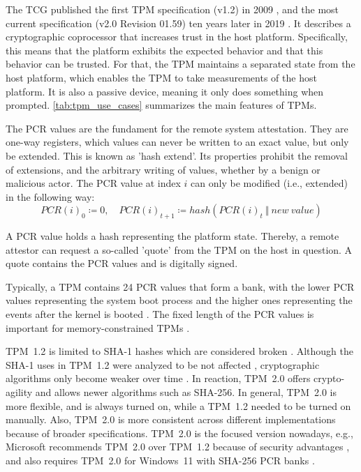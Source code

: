 The \ac{TCG} published the first TPM specification (v1.2) in 2009 \cite{ISO11889}, and the most current specification (v2.0 Revision 01.59) ten years later in 2019 \cite{tpm}.
It describes a cryptographic coprocessor that increases trust in the host platform. Specifically, this means that the platform exhibits the expected behavior and that this behavior can be trusted.
For that, the TPM maintains a separated state from the host platform, which enables the TPM to take measurements of the host platform.
It is also a passive device, meaning it only does something when prompted.
\autoref{tab:tpm_use_cases} summarizes the main features of TPMs.



The \ac{PCR} values are the fundament for the remote system attestation. They are one-way registers, which values can never be written to an exact value, but only be extended.
This is known as 'hash extend'.
Its properties prohibit the removal of extensions, and the arbitrary writing of values, whether by a benign or malicious actor.
The PCR value at index $i$ can only be modified (i.e., extended) in the following way:
\[ PCR(i)_0 \coloneqq 0,\quad PCR(i)_{t+1} \coloneqq hash(PCR(i)_t\ \Vert\ new\ value)\]

A PCR value holds a hash representing the platform state.
Thereby, a remote attestor can request a so-called 'quote' from the TPM on the host in question.
A quote contains the PCR values and is digitally signed.

Typically, a TPM contains 24 PCR values that form a bank, with the lower PCR values representing the system boot process and the higher ones representing the events after the kernel is booted \cite{Arthur2015}.
The fixed length of the \ac{PCR} values is important for memory-constrained TPMs \cite{Arthur2015}.

%


TPM~1.2 is limited to SHA-1 hashes which are considered broken \cite{cryptoeprint:2005/010, Wang2005, Stevens2017}. Although the SHA-1 uses in TPM~1.2 were analyzed to be not affected \cite{sha1tpm12}, cryptographic algorithms only become weaker over time \cite{Arthur2015}. In reaction, TPM~2.0 offers crypto-agility and allows newer algorithms such as SHA-256. In general, TPM~2.0 is more flexible, and is always turned on, while a TPM~1.2 needed to be turned on manually. Also, TPM~2.0 is more consistent across different implementations because of broader specifications.
TPM~2.0 is the focused version nowadays, e.g., Microsoft recommends TPM~2.0 over TPM~1.2 because of security advantages \cite{micrec}, and also requires TPM~2.0 for Windows~11 with SHA-256 PCR banks \cite{win11req}.

